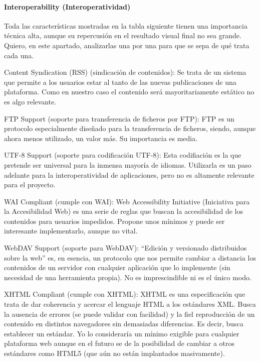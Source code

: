 \paragraph{Interoperability (Interoperatividad)}
\par Toda las características mostradas en la tabla siguiente tienen una importancia técnica alta, aunque su repercusión en el resultado visual final no sea grande. Quiero, en este apartado, analizarlas una por una para que se sepa de qué trata cada una.

\par Content Syndication (RSS) (sindicación de contenidos): Se trata de un sistema que permite a los usuarios estar al tanto de las nuevas publicaciones de una plataforma. Como en nuestro caso el contenido será mayoritariamente estático no es algo relevante.

\par FTP Support (soporte para transferencia de ficheros por FTP): FTP es un protocolo especialmente diseñado para la transferencia de ficheros, siendo, aunque ahora menos utilizado, un valor más. Su importancia es media.

\par UTF-8 Support (soporte para codificación UTF-8): Esta codifiación es la que pretende ser universal para la inmensa mayoría de idiomas. Utilizarla es un paso adelante para la interoperatividad de aplicaciones, pero no es altamente relevante para el proyecto.

\par WAI Compliant (cumple con WAI): Web Accessibility Initiative (Iniciativa para la Accesibilidad Web) es una serie de reglas que buscan la accesibilidad de los contenidos para usuarios impedidos. Propone unos mínimos y puede ser interesante implementarlo, aunque no vital.

\par WebDAV Support (soporte para WebDAV): ``Edición y versionado distribuidos sobre la web'' es, en esencia, un protocolo que nos permite cambiar a distancia los contenidos de un servidor con cualquier aplicación que lo implemente (sin necesidad de una herramienta propia). No es imprescindible ni es el único modo.

\par XHTML Compliant (cumple con XHTML): XHTML es una especificación que trata de dar coherencia y acercar el lenguaje HTML a los estándares XML. Busca la ausencia de errores (se puede validar con facilidad) y la fiel reproducción de un contenido en distintos navegadores sin demasiadas diferencias. Es decir, busca establecer un estándar. Yo lo consideraría un mínimo exigible para cualquier plataforma web aunque en el futuro se de la posibilidad de cambiar a otros estándares como HTML5 (que aún no están implantados masivamente).


